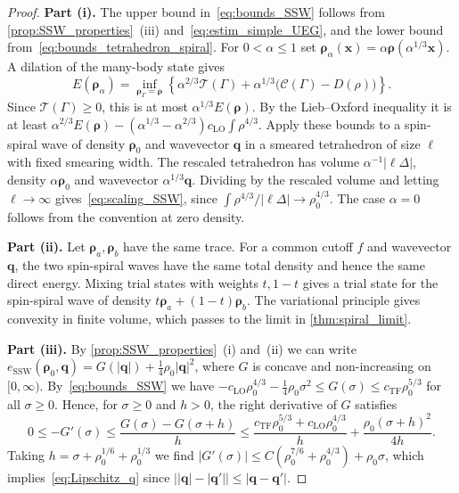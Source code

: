 \documentclass[final,reqno]{amsart}
\theoremstyle{remark}
\renewcommand{\le}{\leqslant}
\renewcommand{\ge}{\geqslant}
\newcommand{\TF}{\mathrm{TF}}
\newcommand{\LO}{\mathrm{LO}}
\newcommand{\SSW}{\mathrm{SSW}}
\newcommand{\tetra}{\mathbb{\Delta}}
\newcommand{\TC}{\mathcal{T}}
\newcommand{\Cc}{\mathcal{C}}
\begin{document}
\begin{proof}
\noindent\textbf{Part (i).} The upper bound in~\cref{eq:bounds_SSW} follows from \cref{prop:SSW_properties}~(iii) and~\cref{eq:estim_simple_UEG}, and the lower bound from~\cref{eq:bounds_tetrahedron_spiral}. For $0<\alpha\le1$ set $\bm{\rho}_\alpha(\mathbf{x})=\alpha\bm{\rho}(\alpha^{1/3}\mathbf{x})$. A dilation of the many-body state gives
\[
 E(\bm{\rho}_\alpha)=\inf_{\bm{\rho}_\Gamma=\bm{\rho}}
 \left\{\alpha^{2/3}\TC(\Gamma)+\alpha^{1/3}\big(\Cc(\Gamma)-D(\rho)\big)\right\}.
\]
Since $\TC(\Gamma)\ge0$, this is at most $\alpha^{1/3}E(\bm{\rho})$. By the Lieb--Oxford inequality it is at least $\alpha^{2/3}E(\bm{\rho})-(\alpha^{1/3}-\alpha^{2/3})c_\LO\int\rho^{4/3}$. Apply these bounds to a spin-spiral wave of density $\bm{\rho}_0$ and wavevector $\mathbf{q}$ in a smeared tetrahedron of size $\ell$ with fixed smearing width. The rescaled tetrahedron has volume $\alpha^{-1}|\ell\tetra|$, density $\alpha\bm{\rho}_0$ and wavevector $\alpha^{1/3}\mathbf{q}$. Dividing by the rescaled volume and letting $\ell\to\infty$ gives~\cref{eq:scaling_SSW}, since $\int\rho^{4/3}/|\ell\tetra|\to\rho_0^{4/3}$. The case $\alpha=0$ follows from the convention at zero density.

\medskip

\noindent\textbf{Part (ii).} Let $\bm{\rho}_a,\bm{\rho}_b$ have the same trace. For a common cutoff $f$ and wavevector $\mathbf{q}$, the two spin-spiral waves have the same total density and hence the same direct energy. Mixing trial states with weights $t,1-t$ gives a trial state for the spin-spiral wave of density $t\bm{\rho}_a+(1-t)\bm{\rho}_b$. The variational principle gives convexity in finite volume, which passes to the limit in \cref{thm:spiral_limit}.

\medskip

\noindent\textbf{Part (iii).} By \cref{prop:SSW_properties}~(i) and~(ii) we can write $e_\SSW(\bm{\rho}_0,\mathbf{q})=G(|\mathbf{q}|)+\frac14\rho_0|\mathbf{q}|^2$, where $G$ is concave and non-increasing on $[0,\infty)$. By~\cref{eq:bounds_SSW} we have $-c_\LO\rho_0^{4/3}-\frac14\rho_0\sigma^2\le G(\sigma)\le c_\TF\rho_0^{5/3}$ for all $\sigma\ge0$. Hence, for $\sigma\ge0$ and $h>0$, the right derivative of $G$ satisfies
$$
0\le -G'(\sigma)\le\frac{G(\sigma)-G(\sigma+h)}{h}\le\frac{c_\TF\rho_0^{5/3}+c_\LO\rho_0^{4/3}}{h}+\frac{\rho_0(\sigma+h)^2}{4h}.
$$
Taking $h=\sigma+\rho_0^{1/6}+\rho_0^{1/3}$ we find $|G'(\sigma)|\le C(\rho_0^{7/6}+\rho_0^{4/3})+\rho_0\sigma$, which implies~\cref{eq:Lipschitz_q} since $\big||\mathbf{q}|-|\mathbf{q}'|\big|\le|\mathbf{q}-\mathbf{q}'|$.


\end{proof}
\end{document}
